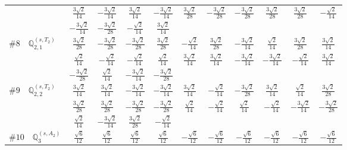\documentclass[fleqn,9pt,landscape]{jsarticle}
\begin{document}
\begin{center}
\begin{longtable}{lcccccccccc}
& $ \frac{3 \sqrt{2}}{14} $ & $ - \frac{3 \sqrt{2}}{14} $ & $ \frac{3 \sqrt{2}}{14} $ & $ - \frac{3 \sqrt{2}}{14} $ & $ \frac{3 \sqrt{2}}{28} $ & $ - \frac{3 \sqrt{2}}{28} $ & $ - \frac{3 \sqrt{2}}{28} $ & $ \frac{3 \sqrt{2}}{28} $ & $ \frac{3 \sqrt{2}}{28} $ & $ - \frac{\sqrt{2}}{14} $ \\
& $ - \frac{3 \sqrt{2}}{14} $ & $ - \frac{3 \sqrt{2}}{28} $ & $ - \frac{\sqrt{2}}{14} $ & $ \frac{3 \sqrt{2}}{14} $ & $  $ & $  $ & $  $ & $  $ & $  $ & $  $ \\ \hline
$ \#8\quad \mathbb{Q}_{2,1}^{(s,T_{2})} $ & $ \frac{3 \sqrt{2}}{28} $ & $ - \frac{3 \sqrt{2}}{28} $ & $ - \frac{3 \sqrt{2}}{28} $ & $ \frac{3 \sqrt{2}}{28} $ & $ - \frac{\sqrt{2}}{14} $ & $ \frac{3 \sqrt{2}}{28} $ & $ - \frac{3 \sqrt{2}}{14} $ & $ \frac{\sqrt{2}}{14} $ & $ \frac{3 \sqrt{2}}{28} $ & $ \frac{3 \sqrt{2}}{14} $ \\
& $ \frac{\sqrt{2}}{14} $ & $ - \frac{\sqrt{2}}{14} $ & $ - \frac{\sqrt{2}}{14} $ & $ \frac{\sqrt{2}}{14} $ & $ \frac{3 \sqrt{2}}{14} $ & $ \frac{3 \sqrt{2}}{14} $ & $ - \frac{3 \sqrt{2}}{14} $ & $ - \frac{3 \sqrt{2}}{14} $ & $ - \frac{\sqrt{2}}{14} $ & $ \frac{3 \sqrt{2}}{14} $ \\
& $ - \frac{3 \sqrt{2}}{28} $ & $ \frac{\sqrt{2}}{14} $ & $ - \frac{3 \sqrt{2}}{14} $ & $ - \frac{3 \sqrt{2}}{28} $ & $  $ & $  $ & $  $ & $  $ & $  $ & $  $ \\ \hline
$ \#9\quad \mathbb{Q}_{2,2}^{(s,T_{2})} $ & $ \frac{3 \sqrt{2}}{14} $ & $ \frac{3 \sqrt{2}}{14} $ & $ - \frac{3 \sqrt{2}}{14} $ & $ - \frac{3 \sqrt{2}}{14} $ & $ \frac{3 \sqrt{2}}{14} $ & $ - \frac{\sqrt{2}}{14} $ & $ - \frac{3 \sqrt{2}}{28} $ & $ \frac{3 \sqrt{2}}{14} $ & $ \frac{\sqrt{2}}{14} $ & $ \frac{3 \sqrt{2}}{28} $ \\
& $ \frac{3 \sqrt{2}}{28} $ & $ \frac{3 \sqrt{2}}{28} $ & $ - \frac{3 \sqrt{2}}{28} $ & $ - \frac{3 \sqrt{2}}{28} $ & $ \frac{\sqrt{2}}{14} $ & $ - \frac{\sqrt{2}}{14} $ & $ \frac{\sqrt{2}}{14} $ & $ - \frac{\sqrt{2}}{14} $ & $ - \frac{3 \sqrt{2}}{14} $ & $ - \frac{3 \sqrt{2}}{28} $ \\
& $ \frac{\sqrt{2}}{14} $ & $ - \frac{3 \sqrt{2}}{14} $ & $ \frac{3 \sqrt{2}}{28} $ & $ - \frac{\sqrt{2}}{14} $ & $  $ & $  $ & $  $ & $  $ & $  $ & $  $ \\ \hline
$ \#10\quad \mathbb{Q}_{3}^{(s,A_{2})} $ & $ \frac{\sqrt{6}}{12} $ & $ \frac{\sqrt{6}}{12} $ & $ \frac{\sqrt{6}}{12} $ & $ \frac{\sqrt{6}}{12} $ & $ - \frac{\sqrt{6}}{12} $ & $ - \frac{\sqrt{6}}{12} $ & $ - \frac{\sqrt{6}}{12} $ & $ - \frac{\sqrt{6}}{12} $ & $ - \frac{\sqrt{6}}{12} $ & $ - \frac{\sqrt{6}}{12} $ \\

\end{longtable}
\end{center}
\end{document}

